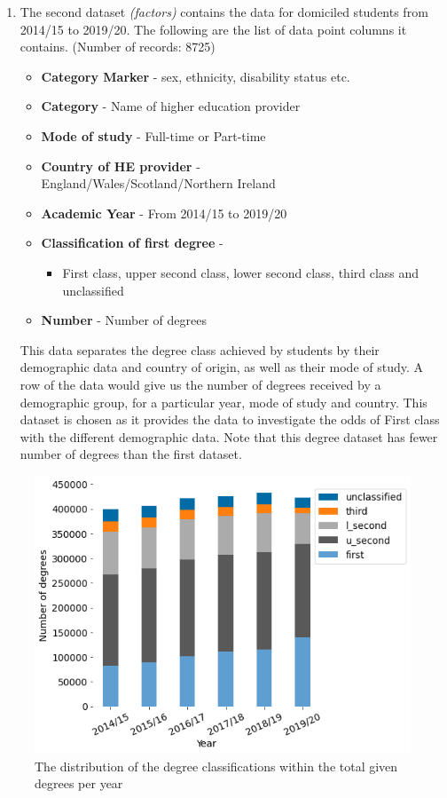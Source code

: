 \documentclass[11pt,a4paper]{article}
\begin{document}
\begin{enumerate}
  \item The second dataset \textit{(factors)} contains the data for domiciled students from 2014/15 to 2019/20. The following are the list of data point columns it contains. (Number of records: 8725)
  \begin{multicols}{2}
  \begin{itemize}
      \item \textbf{Category Marker} - sex, ethnicity, disability status etc. 
      \item \textbf{Category} - Name of higher education provider
      \item \textbf{Mode of study} - Full-time or Part-time
      \item \textbf{Country of HE provider} - \\England/Wales/Scotland/Northern Ireland
      \item \textbf{Academic Year} - From 2014/15 to 2019/20
      \item \textbf{Classification of first degree} -
      \begin{itemize}
          \item First class, upper second class, lower second class, third class and unclassified
      \end{itemize}
      \item \textbf{Number} - Number of degrees
  \end{itemize}
  \end{multicols}

  This data separates the degree class achieved by students by their demographic data and country of origin, as well as their mode of study. A row of the data would give us the number of degrees received by a demographic group, for a particular year, mode of study and country. This dataset is chosen as it provides the data to investigate the odds of First class with the different demographic data.
  Note that this degree dataset has fewer number of degrees  than the first dataset.
\end{enumerate}


\begin{figure}[t]
  \centering
  \includegraphics[scale=0.6]{figures/Stacked_Bar_Chart.png}
  \caption{The distribution of the degree classifications within the total given degrees per year}
  \label{stacked-barchart}
\end{figure}
\end{document}
